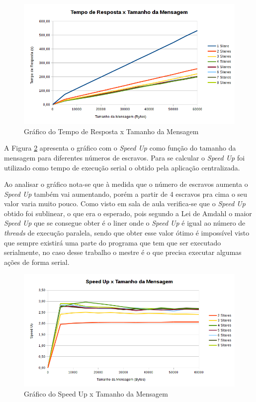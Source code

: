\documentclass[
	12pt,				%
    oneside,			%
	a4paper,			%
	english,			%
	brazil,				%
	]{abntex2}
\begin{document}
\begin{figure}[!htb]
\centering
\includegraphics[scale=0.65]{figuras/temporesposta_centralizado.png}
\caption{Gráfico do Tempo de Resposta x Tamanho da Mensagem}
\label{fig:cent:tempo_respostaXtamanho_msg}
\end{figure}

A Figura \ref{fig:cent:speedupXtamanho_msg} apresenta o gráfico com o \textit{Speed Up} como função do tamanho da mensagem para diferentes números de escravos. Para se calcular o \textit{Speed Up} foi utilizado como tempo de execução serial o obtido pela aplicação centralizada.

Ao analisar o gráfico nota-se que à medida que o número de escravos aumenta o \textit{Speed Up} também vai aumentando, porém 
a partir de 4 escravos pra cima o seu valor varia muito pouco. Como visto em sala de aula verifica-se que o \textit{Speed Up}
obtido foi sublinear, o que era o esperado, pois segundo a Lei de Amdahl o maior \textit{Speed Up} que se consegue obter é o liner onde o \textit{Speed Up} é igual ao número de \textit{threads} de execução paralela, sendo que obter esse valor ótimo é
impossível visto que sempre existirá uma parte do programa que tem que ser executado serialmente, no caso desse trabalho o 
mestre é o que precisa executar algumas ações de forma serial.

\begin{figure}[!htb]
\centering
\includegraphics[scale=0.55]{figuras/speedup_centralizado.png}
\caption{Gráfico do Speed Up x Tamanho da Mensagem}
\label{fig:cent:speedupXtamanho_msg}
\end{figure}
\end{document}
